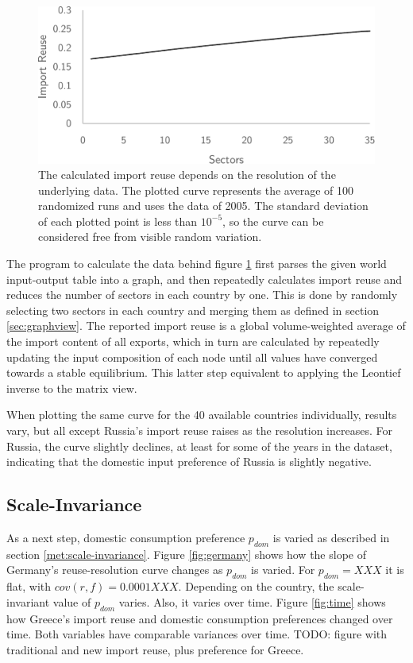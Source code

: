 \documentclass[english]{uzhpub}
\begin{document}
\begin{figure}
\centering
\includegraphics[scale=0.4]{../data/resolution}
\caption{The calculated import reuse depends on the resolution of the underlying data. The plotted curve represents the average of 100 randomized runs and uses the data of 2005. The standard deviation of each plotted point is less than $10^{-5}$, so the curve can be considered free from visible random variation.} \label{fig:varying}
\end{figure}

The program to calculate the data behind figure \ref{fig:varying} first parses the given world input-output table into a graph, and then repeatedly calculates import reuse and reduces the number of sectors in each country by one. This is done by randomly selecting two sectors in each country and merging them as defined in section \ref{sec:graphview}. The reported import reuse is a global volume-weighted average of the import content of all exports, which in turn are calculated by repeatedly updating the input composition of each node until all values have converged towards a stable equilibrium. This latter step equivalent to applying the Leontief inverse to the matrix view.

When plotting the same curve for the 40 available countries individually, results vary, but all except Russia's import reuse raises as the resolution increases. For Russia, the curve slightly declines, at least for some of the years in the dataset, indicating that the domestic input preference of Russia is slightly negative.

\subsection{Scale-Invariance}
As a next step, domestic consumption preference $p_{dom}$ is varied as described in section \ref{met:scale-invariance}. Figure \ref{fig:germany} shows how the slope of Germany's reuse-resolution curve changes as $p_{dom}$ is varied. For $p_{dom}=XXX$ it is flat, with $cov(r, f) = 0.0001 XXX$. Depending on the country, the scale-invariant value of $p_{dom}$ varies. Also, it varies over time. Figure \ref{fig:time} shows how Greece's import reuse and domestic consumption preferences changed over time. Both variables have comparable variances over time. TODO: figure with traditional and new import reuse, plus preference for Greece.
\end{document}
